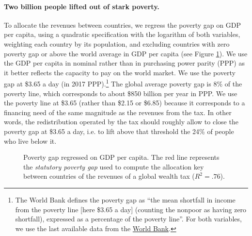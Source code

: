 \documentclass[12pt,english]{article}
\begin{document}
\paragraph{Two billion people lifted out of stark poverty.} To allocate the revenues between countries, we regress the poverty gap on GDP per capita, using a quadratic specification with the logarithm of both variables, weighting each country by its population, and excluding countries with zero poverty gap or above the world average in GDP per capita (see Figure \ref{fig:gap_GDP}). We use the GDP per capita in nominal  rather than in purchasing power parity (PPP) as it better reflects the capacity to pay on the world market. %
We use the poverty gap at \$3.65 a day (in 2017 PPP).\footnote{The World Bank defines the poverty gap as ``the mean shortfall in income from the poverty line [here \$3.65 a day] (counting the nonpoor as having zero shortfall), expressed as a percentage of the poverty line''. For both variables, we use the last available data from the \href{https://data.worldbank.org/indicator/SI.POV.LMIC.GP}{World Bank}.} The global average poverty gap is 8\% of the poverty line, which corresponds to about \$850 billion per year in PPP. We use the poverty line at \$3.65 (rather than \$2.15 or \$6.85) because it corresponds to a financing need of the same magnitude as the revenues from the tax. In other words, the redistribution operated by the tax should roughly allow to close the poverty gap at \$3.65 a day, i.e. to lift above that threshold the 24\% of people who live below it. 

\begin{figure}[b!]
  \caption{Poverty gap regressed on GDP per capita. The red line represents the \textit{statutory poverty gap} used to compute the allocation key between countries of the revenues of a global wealth tax ($R^2 = .76$). }\label{fig:gap_GDP}
\end{figure}
\end{document}
